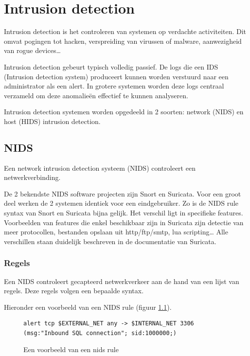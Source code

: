 \documentclass[a4paper,12pt]{report}
\begin{document}
\chapter{Intrusion detection}
Intrusion detection is het controleren van systemen op verdachte activiteiten.
Dit omvat pogingen tot hacken, verspreiding van virussen of malware, aanwezigheid van rogue devices\dots

Intrusion detection gebeurt typisch volledig passief.
De logs die een IDS (Intrusion detection system) produceert kunnen worden verstuurd naar een administrator als een alert.
In grotere systemen worden deze logs centraal verzameld om deze anomalieën effectief te kunnen analyseren.
\autocite{wikipedia:ids}

Intrusion detection systemen worden opgedeeld in 2 soorten: network (NIDS) en host (HIDS) intrusion detection.

\section{NIDS}
Een network intrusion detection systeem (NIDS) controleert een netwerkverbinding.

De 2 bekendste NIDS software projecten zijn Snort en Suricata.
Voor een groot deel werken de 2 systemen identiek voor een eindgebruiker.
Zo is de NIDS rule syntax van Snort en Suricata bijna gelijk.
Het verschil ligt in specifieke features.
Voorbeelden van features die enkel beschikbaar zijn in Suricata zijn detectie van meer protocollen, bestanden opslaan uit http/ftp/smtp, lua scripting\dots
Alle verschillen staan duidelijk beschreven in de documentatie van Suricata.
\autocite{suricata:docs}

\subsection{Regels}
Een NIDS controleert gecapteerd netwerkverkeer aan de hand van een lijst van regels.
Deze regels volgen een bepaalde syntax.

Hieronder een voorbeeld van een NIDS rule (figuur \ref{fig:nids-rule}).

\begin{figure}[H]
  \begin{lstlisting}
alert tcp $EXTERNAL_NET any -> $INTERNAL_NET 3306 (msg:"Inbound SQL connection"; sid:1000000;)
  \end{lstlisting}
  \caption{Een voorbeeld van een nids rule}
  \label{fig:nids-rule}
\end{figure}
\end{document}
